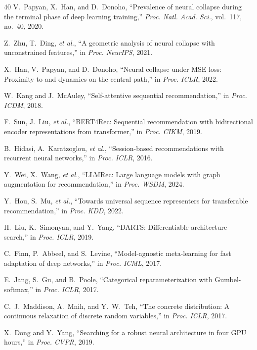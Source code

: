 \documentclass[lettersize,journal]{IEEEtran}
\begin{document}
\begin{thebibliography}{40}
V.~Papyan, X.~Han, and D.~Donoho,
``Prevalence of neural collapse during the terminal phase of deep learning
training,''
\textit{Proc. Natl. Acad. Sci.}, vol.~117, no.~40, 2020.

Z.~Zhu, T.~Ding, \textit{et al.},
``A geometric analysis of neural collapse with unconstrained features,''
in \textit{Proc. NeurIPS}, 2021.

X.~Han, V.~Papyan, and D.~Donoho,
``Neural collapse under MSE loss: Proximity to and dynamics on the central
path,''
in \textit{Proc. ICLR}, 2022.

W.~Kang and J.~McAuley,
``Self-attentive sequential recommendation,''
in \textit{Proc. ICDM}, 2018.

F.~Sun, J.~Liu, \textit{et al.},
``BERT4Rec: Sequential recommendation with bidirectional encoder
representations from transformer,''
in \textit{Proc. CIKM}, 2019.

B.~Hidasi, A.~Karatzoglou, \textit{et al.},
``Session-based recommendations with recurrent neural networks,''
in \textit{Proc. ICLR}, 2016.

Y.~Wei, X.~Wang, \textit{et al.},
``LLMRec: Large language models with graph augmentation for recommendation,''
in \textit{Proc. WSDM}, 2024.

Y.~Hou, S.~Mu, \textit{et al.},
``Towards universal sequence representers for transferable recommendation,''
in \textit{Proc. KDD}, 2022.

H.~Liu, K.~Simonyan, and Y.~Yang,
``DARTS: Differentiable architecture search,''
in \textit{Proc. ICLR}, 2019.

C.~Finn, P.~Abbeel, and S.~Levine,
``Model-agnostic meta-learning for fast adaptation of deep networks,''
in \textit{Proc. ICML}, 2017.

E.~Jang, S.~Gu, and B.~Poole,
``Categorical reparameterization with Gumbel-softmax,''
in \textit{Proc. ICLR}, 2017.

C.~J.~Maddison, A.~Mnih, and Y.~W.~Teh,
``The concrete distribution: A continuous relaxation of discrete random
variables,''
in \textit{Proc. ICLR}, 2017.

X.~Dong and Y.~Yang,
``Searching for a robust neural architecture in four GPU hours,''
in \textit{Proc. CVPR}, 2019.


\end{thebibliography}
\end{document}
